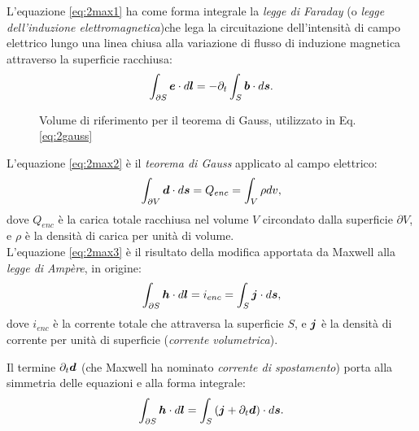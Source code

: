 L'equazione \eqref{eq:2max1} ha come forma integrale la \textit{legge di Faraday} (o \textit{legge dell'induzione elettromagnetica})che lega la circuitazione dell'intensità di campo elettrico lungo una linea chiusa alla variazione di flusso di induzione magnetica attraverso la superficie racchiusa:
\begin{equation}
\label{eq:2faraday}
\int_{\partial S} \boldsymbol{e}\cdot d\boldsymbol{l} = -\partial_t \int_S \boldsymbol{b} \cdot d\boldsymbol{s}.
\end{equation}

\begin{figure}
\caption{Volume di riferimento per il teorema di Gauss, utilizzato in Eq. \eqref{eq:2gauss}}
\label{fig:2.2}
\end{figure}

L'equazione \eqref{eq:2max2} è il \textit{teorema di Gauss} applicato al campo elettrico:
\begin{equation}
\label{eq:2gauss}
\int_{\partial V} \boldsymbol{d} \cdot d\boldsymbol{s}= Q_{enc} = \int_V \rho dv,
\end{equation}
dove $Q_{enc}$ è la carica totale racchiusa nel volume $V$ circondato dalla superficie $\partial V$, e $\rho$ è la densità di carica per unità di volume.
\\
L'equazione \eqref{eq:2max3} è il risultato della modifica apportata da Maxwell alla \textit{legge di  Ampère}, in origine:
\[
\int_{\partial S} \boldsymbol{h} \cdot d\boldsymbol{l} = i_{enc} = \int_S \boldsymbol{j} \cdot d\boldsymbol{s},
\]
dove $i_{enc}$ è la corrente totale che attraversa la superficie $S$, e $\boldsymbol{j}$ è la densità di corrente per unità di superficie (\textit{corrente volumetrica}).

Il termine $\partial_t \boldsymbol{d}$ (che Maxwell ha nominato \textit{corrente di spostamento}) porta alla simmetria delle equazioni e alla forma integrale:
\begin{equation}
\label{eq:2ampere2}
\int_{\partial S} \boldsymbol{h} \cdot d\boldsymbol{l} = \int_S \left( \boldsymbol{j} + \partial_t \boldsymbol{d} \right) \cdot d\boldsymbol{s}.
\end{equation}

